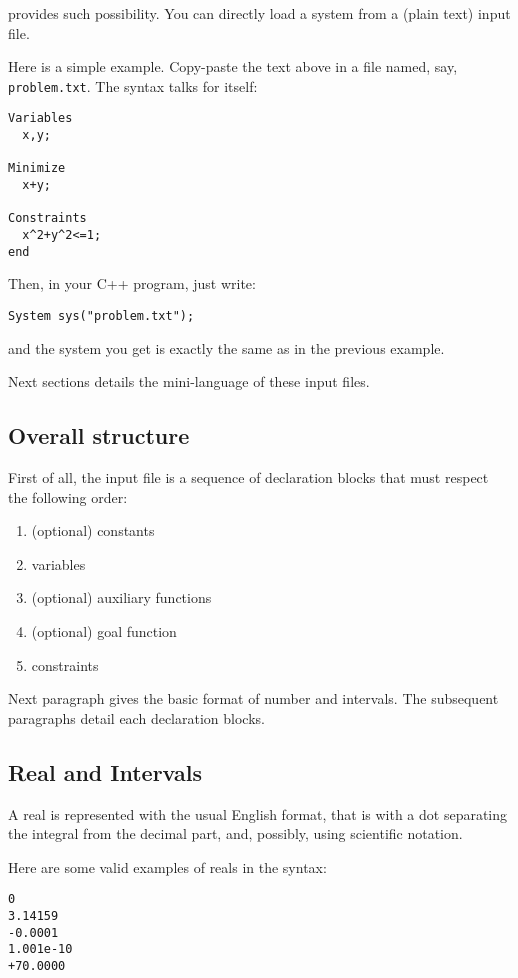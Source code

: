\ibex provides such possibility. You can directly load a system from a (plain text) input file.

Here is a simple example. Copy-paste the text above in a file named, say, {\tt problem.txt}. 
The syntax talks for itself:

\begin{verbatim}
Variables
  x,y;

Minimize
  x+y;

Constraints
  x^2+y^2<=1;
end
\end{verbatim}

Then, in your C++ program, just write:

\begin{lstlisting}
System sys("problem.txt");
\end{lstlisting}

and the system you get is exactly the same as in the previous example.

Next sections details the mini-language of these input files. 

\subsection{Overall structure}
First of all, the input file is a sequence of declaration blocks that must respect the following order:
\begin{enumerate}
\item (optional) constants
\item variables
\item (optional) auxiliary functions
\item (optional) goal function
\item constraints
\end{enumerate}

Next paragraph gives the basic format of number and intervals.
The subsequent paragraphs detail each declaration blocks.

\subsection{Real and Intervals}
A real is represented with the usual English format, that is
with a dot separating the integral from the decimal part,
and, possibly, using scientific notation.

Here are some valid examples of reals in the syntax:
\begin{verbatim}
0
3.14159
-0.0001
1.001e-10
+70.0000
\end{verbatim}
 
